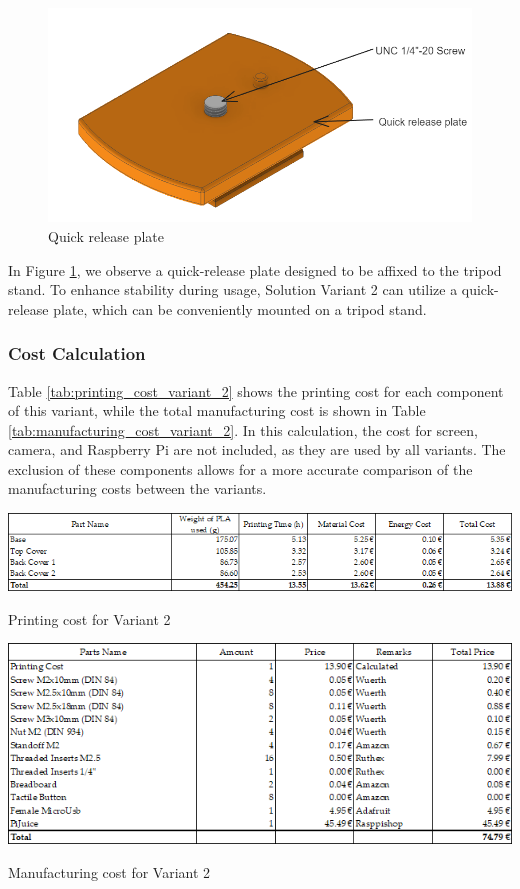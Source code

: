 \begin{figure}[ht!]
    \centering
    \includegraphics[height=5 cm]{texs/Part1/chapter4/image/v29.png}
    \caption{Quick release plate}
    \label{fig:variant2_quick_release_plate}
\end{figure}

In Figure \ref{fig:variant2_quick_release_plate}, we observe a quick-release plate designed to be affixed to the tripod stand. To enhance stability during usage, Solution Variant 2 can utilize a quick-release plate, which can be conveniently mounted on a tripod stand.

\subsubsection{Cost Calculation}
Table \ref{tab:printing_cost_variant_2} shows the printing cost for each component of this variant, while the total manufacturing cost is shown in Table \ref{tab:manufacturing_cost_variant_2}. In this calculation, the cost for screen, camera, and Raspberry Pi are not included, as they are used by all variants. The exclusion of these components allows for a more accurate comparison of the manufacturing costs between the variants.

\begin{table}[H]
    \centering
    \includegraphics[width=\linewidth]{texs/Part1/chapter3/image/v2printed.png}
    \caption{Printing cost for Variant 2}
    \label{tab:printing_cost_variant_2}
\end{table}

\begin{table}[H]
    \centering
    \includegraphics[width=\linewidth]{texs/Part1/chapter3/image/v2manu.png}
    \caption{Manufacturing cost for Variant 2}
    \label{tab:manufacturing_cost_variant_2}
\end{table}

